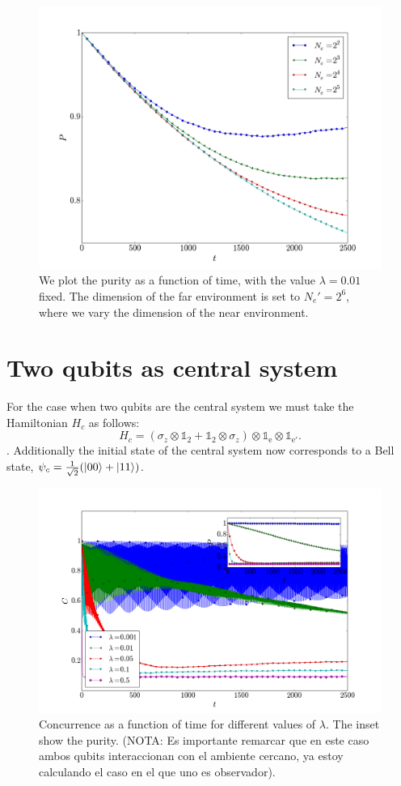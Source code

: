 \documentclass[floatfix]{article}
\newcommand{\id}{\mathbb{1}}
\begin{document}
\begin{figure}[H]  
 \centering
 \includegraphics[width=.8\textwidth]{grafica4.png}
   \caption{ We plot the purity as a function of time, with the value $\lambda=0.01$ fixed. The dimension of the far environment
 is set to $N_e'=2^6$, where we vary the dimension of the near environment.}
\end{figure} 



\section{Two qubits as central system}

For the case when two qubits are the central system we must take the Hamiltonian $H_c$ as follows:
$$H_c=(\sigma_z \otimes \id_{2} + \id_{2}  \otimes \sigma_z) \otimes \id_{\text{e}} \otimes \id_{\text{e}'}.$$.
Additionally the initial state of the central system now corresponds to a Bell state, $\psi_c = \frac{1}{\sqrt{2}}( \Ket{00} + \Ket{11})$. 


\begin{figure}[H]  
 \centering
 \includegraphics[width=.8\textwidth]{grafica3.png}
 \caption{Concurrence as a function of time for different values of $\lambda$. The inset show the purity.
 (NOTA: Es importante remarcar que en este caso ambos qubits interaccionan con el ambiente cercano, ya estoy
 calculando el caso en el que uno es observador).}
\end{figure} 
\end{document}
